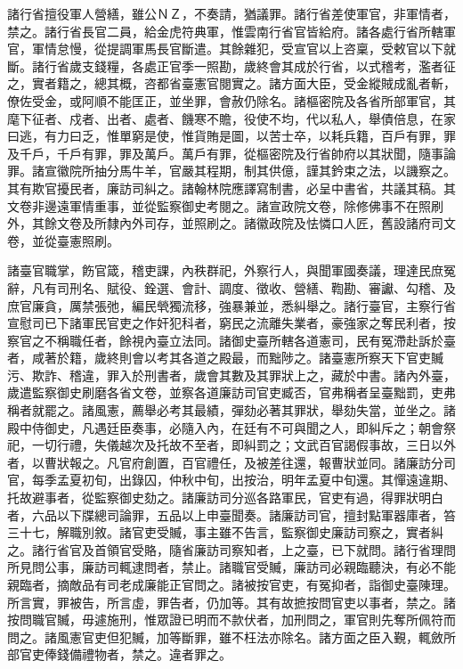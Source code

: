 \begin{pinyinscope}
 諸行省擅役軍人營繕，雖公ＮＺ，不奏請，猶議罪。諸行省差使軍官，非軍情者，禁之。諸行省長官二員，給金虎符典軍，惟雲南行省官皆給府。諸各處行省所轄軍官，軍情怠慢，從提調軍馬長官斷遣。其餘雜犯，受宣官以上咨稟，受敕官以下就斷。諸行省歲支錢糧，各處正官季一照勘，歲終會其成於行省，以式稽考，濫者征之，實者籍之，總其概，咨都省臺憲官閱實之。諸方面大臣，受金縱賊成亂者斬，僚佐受金，或阿順不能匡正，並坐罪，會赦仍除名。諸樞密院及各省所部軍官，其麾下征者、戍者、出者、處者、饑寒不贍，役使不均，代以私人，舉債倍息，在家曰逃，有力曰乏，惟單窮是使，惟貨賄是圖，以苦士卒，以耗兵籍，百戶有罪，罪及千戶，千戶有罪，罪及萬戶。萬戶有罪，從樞密院及行省帥府以其狀聞，隨事論罪。諸宣徽院所抽分馬牛羊，官嚴其程期，制其供億，謹其鈐束之法，以譏察之。其有欺官擾民者，廉訪司糾之。諸翰林院應譯寫制書，必呈中書省，共議其稿。其文卷非邊遠軍情重事，並從監察御史考閱之。諸宣政院文卷，除修佛事不在照刷外，其餘文卷及所隸內外司存，並照刷之。諸徽政院及怯憐口人匠，舊設諸府司文卷，並從臺憲照刷。



 諸臺官職掌，飭官箴，稽吏課，內秩群祀，外察行人，與聞軍國奏議，理達民庶冤辭，凡有司刑名、賦役、銓選、會計、調度、徵收、營繕、鞫勘、審讞、勾稽、及庶官廉貪，厲禁張弛，編民煢獨流移，強暴兼並，悉糾舉之。諸行臺官，主察行省宣慰司已下諸軍民官吏之作奸犯科者，窮民之流離失業者，豪強家之奪民利者，按察官之不稱職任者，餘視內臺立法同。諸御史臺所轄各道憲司，民有冤滯赴訴於臺者，咸著於籍，歲終則會以考其各道之殿最，而黜陟之。諸臺憲所察天下官吏贓污、欺詐、稽違，罪入於刑書者，歲會其數及其罪狀上之，藏於中書。諸內外臺，歲遣監察御史刷磨各省文卷，並察各道廉訪司官吏臧否，官弗稱者呈臺黜罰，吏弗稱者就罷之。諸風憲，薦舉必考其最績，彈劾必著其罪狀，舉劾失當，並坐之。諸殿中侍御史，凡遇廷臣奏事，必隨入內，在廷有不可與聞之人，即糾斥之；朝會祭祀，一切行禮，失儀越次及托故不至者，即糾罰之；文武百官謁假事故，三日以外者，以曹狀報之。凡官府創置，百官禮任，及被差往還，報曹狀並同。諸廉訪分司官，每季孟夏初旬，出錄囚，仲秋中旬，出按治，明年孟夏中旬還。其憚遠違期、托故避事者，從監察御史劾之。諸廉訪司分巡各路軍民，官吏有過，得罪狀明白者，六品以下牒總司論罪，五品以上申臺聞奏。諸廉訪司官，擅封點軍器庫者，笞三十七，解職別敘。諸官吏受贓，事主雖不告言，監察御史廉訪司察之，實者糾之。諸行省官及首領官受賂，隨省廉訪司察知者，上之臺，已下就問。諸行省理問所見問公事，廉訪司輒逮問者，禁止。諸職官受贓，廉訪司必親臨聽決，有必不能親臨者，摘敵品有司老成廉能正官問之。諸被按官吏，有冤抑者，詣御史臺陳理。所言實，罪被告，所言虛，罪告者，仍加等。其有故摭按問官吏以事者，禁之。諸按問職官贓，毋遽施刑，惟眾證已明而不款伏者，加刑問之，軍官則先奪所佩符而問之。諸風憲官吏但犯贓，加等斷罪，雖不枉法亦除名。諸方面之臣入覲，輒斂所部官吏俸錢備禮物者，禁之。違者罪之。




\end{pinyinscope}
